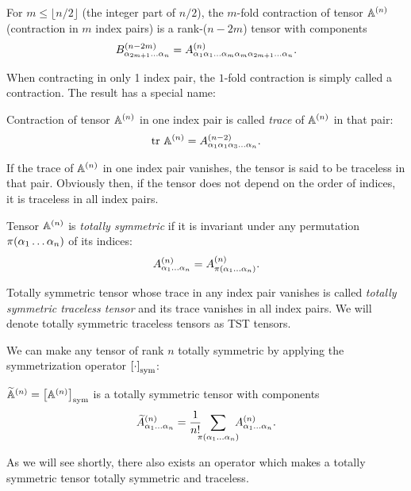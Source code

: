 \begin{definition}
  For $m \leq \lfloor n/2 \rfloor$ (the integer part of $n/2$), the $m$-fold contraction of tensor $\AA$ (contraction 
  in $m$ index pairs) is a rank-($n-2m$) tensor with components
  $$
    \BBB[n-2m]{\alpha_{2m+1}\ldots\alpha_n} = \AAA{\alpha_1\alpha_1\ldots\alpha_m\alpha_m\alpha_{2m+1}\ldots\alpha_n}.
  $$
\end{definition}
When contracting in only 1 index pair, the $1$-fold contraction is simply called a contraction. The result has a special 
name:
\begin{definition}
  Contraction of tensor $\AA$ in one index pair is called \textit{trace} of $\AA$ in that pair:
  $$
    \trace \AA = \AAA[n-2]{\alpha_1\alpha_1\alpha_3\ldots\alpha_n}.
  $$ 
\end{definition}
If the trace of $\AA$ in one index pair vanishes, the tensor is said to be traceless in that pair. Obviously then, if 
the tensor does not depend on the order of indices, it is traceless in all index pairs.
\begin{definition}
  Tensor $\AA$ is \textit{totally symmetric} if it is invariant under any permutation $\perm{\alpha_1\ldots\alpha_n}$ 
  of its indices:
  $$
    \AAA{\alpha_1\ldots\alpha_n} = \AAA{\perm{\alpha_1\ldots\alpha_n}}.
  $$
\end{definition}

\begin{definition}
  Totally symmetric tensor whose trace in any index pair vanishes is called \textit{totally symmetric traceless tensor} 
  and its trace vanishes in all index pairs. We will denote totally symmetric traceless tensors as TST tensors.
\end{definition}

We can make any tensor of rank $n$ totally symmetric by applying the symmetrization operator $\Sym{\cdot}$:
\begin{definition}
  $\widetilde{\mathbb{A}}^{(n)} = \Sym\AA$ is a totally symmetric tensor with components
  $$
    \widetilde A^{(n)}_{\alpha_1\ldots\alpha_n} = \frac{1}{n!}\ \; \sum_{\mathclap{\perm{\alpha_1\ldots\alpha_n}}}\ \;\AAA{\alpha_1\ldots\alpha_n}.
  $$
\end{definition}  
As we will see shortly, there also exists an operator which makes a totally symmetric tensor totally symmetric and traceless.

